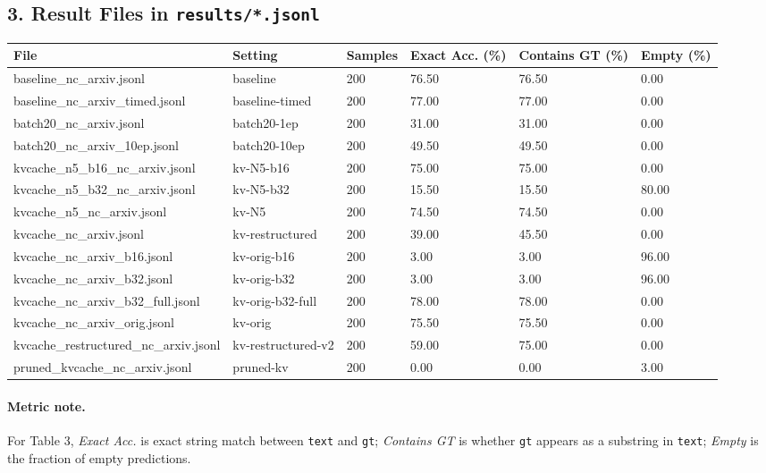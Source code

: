\subsection*{3. Result Files in \texttt{results/*.jsonl}}

\begin{tabular}{llllll}
\toprule
File & Setting & Samples & Exact Acc. (\%) & Contains GT (\%) & Empty (\%) \\
\midrule
baseline\_nc\_arxiv.jsonl & baseline & 200 & 76.50 & 76.50 & 0.00 \\
baseline\_nc\_arxiv\_timed.jsonl & baseline-timed & 200 & 77.00 & 77.00 & 0.00 \\
batch20\_nc\_arxiv.jsonl & batch20-1ep & 200 & 31.00 & 31.00 & 0.00 \\
batch20\_nc\_arxiv\_10ep.jsonl & batch20-10ep & 200 & 49.50 & 49.50 & 0.00 \\
kvcache\_n5\_b16\_nc\_arxiv.jsonl & kv-N5-b16 & 200 & 75.00 & 75.00 & 0.00 \\
kvcache\_n5\_b32\_nc\_arxiv.jsonl & kv-N5-b32 & 200 & 15.50 & 15.50 & 80.00 \\
kvcache\_n5\_nc\_arxiv.jsonl & kv-N5 & 200 & 74.50 & 74.50 & 0.00 \\
kvcache\_nc\_arxiv.jsonl & kv-restructured & 200 & 39.00 & 45.50 & 0.00 \\
kvcache\_nc\_arxiv\_b16.jsonl & kv-orig-b16 & 200 & 3.00 & 3.00 & 96.00 \\
kvcache\_nc\_arxiv\_b32.jsonl & kv-orig-b32 & 200 & 3.00 & 3.00 & 96.00 \\
kvcache\_nc\_arxiv\_b32\_full.jsonl & kv-orig-b32-full & 200 & 78.00 & 78.00 & 0.00 \\
kvcache\_nc\_arxiv\_orig.jsonl & kv-orig & 200 & 75.50 & 75.50 & 0.00 \\
kvcache\_restructured\_nc\_arxiv.jsonl & kv-restructured-v2 & 200 & 59.00 & 75.00 & 0.00 \\
pruned\_kvcache\_nc\_arxiv.jsonl & pruned-kv & 200 & 0.00 & 0.00 & 3.00 \\
\bottomrule
\end{tabular}

\paragraph{Metric note.}
For Table 3, \emph{Exact Acc.} is exact string match between \texttt{text} and \texttt{gt}; \emph{Contains GT} is whether \texttt{gt} appears as a substring in \texttt{text}; \emph{Empty} is the fraction of empty predictions.

